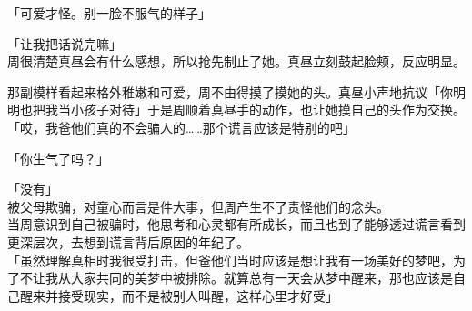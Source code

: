 「可爱才怪。别一脸不服气的样子」

「让我把话说完嘛」\\

周很清楚真昼会有什么感想，所以抢先制止了她。真昼立刻鼓起脸颊，反应明显。

那副模样看起来格外稚嫩和可爱，周不由得摸了摸她的头。真昼小声地抗议「你明明也把我当小孩子对待」于是周顺着真昼手的动作，也让她摸自己的头作为交换。\\

「哎，我爸他们真的不会骗人的……那个谎言应该是特别的吧」

「你生气了吗？」

「没有」\\

被父母欺骗，对童心而言是件大事，但周产生不了责怪他们的念头。\\

当周意识到自己被骗时，他思考和心灵都有所成长，而且也到了能够透过谎言看到更深层次，去想到谎言背后原因的年纪了。\\

「虽然理解真相时我很受打击，但爸他们当时应该是想让我有一场美好的梦吧，为了不让我从大家共同的美梦中被排除。就算总有一天会从梦中醒来，那也应该是自己醒来并接受现实，而不是被别人叫醒，这样心里才好受」\\

